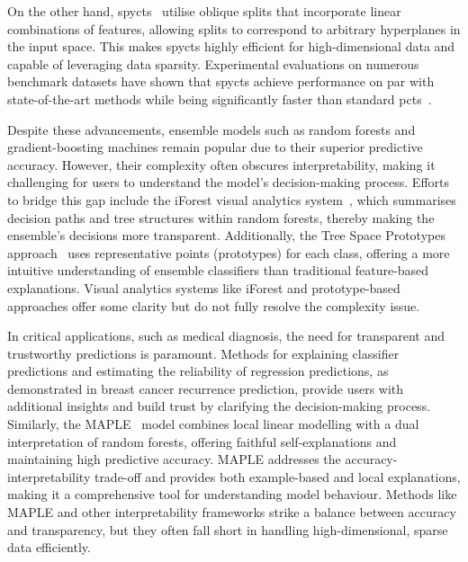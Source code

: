 \documentclass[3p,review,authoryear]{elsarticle}
\begin{document}
On the other hand, \glspl{spyct}~\citep{Stepi_nik_2021} utilise oblique splits that incorporate linear combinations of features, allowing splits to correspond to arbitrary hyperplanes in the input space.
This makes \glspl{spyct} highly efficient for high-dimensional data and capable of leveraging data sparsity.
Experimental evaluations on numerous benchmark datasets have shown that \glspl{spyct} achieve performance on par with state-of-the-art methods while being significantly faster than standard \glspl{pct}~\citep{Andonovikj_2024}.

Despite these advancements, ensemble models such as random forests and gradient-boosting machines remain popular due to their superior predictive accuracy.
However, their complexity often obscures interpretability, making it challenging for users to understand the model’s decision-making process.
Efforts to bridge this gap include the iForest visual analytics system~\citep{Zhao_2019}, which summarises decision paths and tree structures within random forests, thereby making the ensemble's decisions more transparent.
Additionally, the Tree Space Prototypes approach~\citep{Tan_2020} uses representative points (prototypes) for each class, offering a more intuitive understanding of ensemble classifiers than traditional feature-based explanations.
Visual analytics systems like iForest and prototype-based approaches offer some clarity but do not fully resolve the complexity issue.

In critical applications, such as medical diagnosis, the need for transparent and trustworthy predictions is paramount.
Methods for explaining classifier predictions and estimating the reliability of regression predictions, as demonstrated in breast cancer recurrence prediction, provide users with additional insights and build trust by clarifying the decision-making process.
Similarly, the MAPLE~\citep{plumb2018model} model combines local linear modelling with a dual interpretation of random forests, offering faithful self-explanations and maintaining high predictive accuracy.
MAPLE addresses the accuracy-interpretability trade-off and provides both example-based and local explanations, making it a comprehensive tool for understanding model behaviour.
Methods like MAPLE and other interpretability frameworks strike a balance between accuracy and transparency, but they often fall short in handling high-dimensional, sparse data efficiently.
\end{document}
